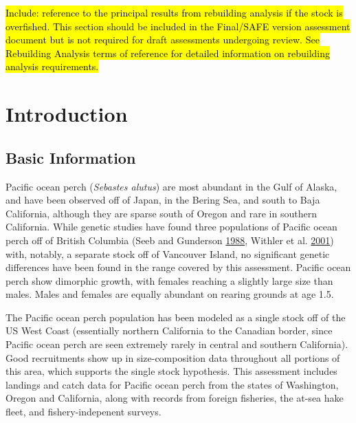\documentclass[12pt,]{article}
\begin{document}
\hl{Include: reference to the principal results from rebuilding analysis if the 
stock is overfished. This section should be included in the Final/SAFE version 
assessment document but is not required for draft assessments undergoing review. 
See Rebuilding Analysis terms of reference for detailed information on 
rebuilding analysis requirements.}

\FloatBarrier

\newpage

\renewcommand{\thefigure}{\arabic{figure}}
\renewcommand{\thetable}{\arabic{table}}

\setcounter{figure}{0} \setcounter{table}{0}

\section{Introduction}\label{introduction}

\subsection{Basic Information}\label{basic-information}

Pacific ocean perch (\emph{Sebastes alutus}) are most abundant in the
Gulf of Alaska, and have been observed off of Japan, in the Bering Sea,
and south to Baja California, although they are sparse south of Oregon
and rare in southern California. While genetic studies have found three
populations of Pacific ocean perch off of British Columbia (Seeb and
Gunderson \protect\hyperlink{ref-seeb_genetic_1988}{1988}, Withler et
al. \protect\hyperlink{ref-withler_co-existing_2001}{2001}) with,
notably, a separate stock off of Vancouver Island, no significant
genetic differences have been found in the range covered by this
assessment. Pacific ocean perch show dimorphic growth, with females
reaching a slightly large size than males. Males and females are equally
abundant on rearing grounds at age 1.5.

The Pacific ocean perch population has been modeled as a single stock
off of the US West Coast (essentially northern California to the
Canadian border, since Pacific ocean perch are seen extremely rarely in
central and southern California). Good recruitments show up in
size-composition data throughout all portions of this area, which
supports the single stock hypothesis. This assessment includes landings
and catch data for Pacific ocean perch from the states of Washington,
Oregon and California, along with records from foreign fisheries, the
at-sea hake fleet, and fishery-indepenent surveys.
\end{document}
